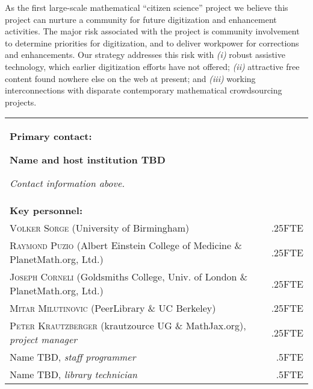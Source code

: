 \documentclass[10pt,letterpaper]{article}
\begin{document}
As the first large-scale mathematical ``citizen science'' project we
believe this project can nurture a community for future digitization
and enhancement activities.  The major risk associated with the
project is community involvement to determine priorities for
digitization, and to deliver workpower for corrections and
enhancements.  Our strategy addresses this risk with \emph{(i)} robust
assistive technology, which earlier digitization efforts have not
offered; \emph{(ii)} attractive free content found nowhere else on the
web at present; and \emph{(iii)} working interconnections with
disparate contemporary mathematical crowdsourcing projects.


\bigskip

\begin{tabular}{p{}r}
\textbf{Primary contact:} \par
\bf{Name and host institution TBD}
\par \emph{Contact information above.} &  \\[1cm]
\textbf{Key personnel:} &\\
\textsc{Volker Sorge} (University of Birmingham) &.25FTE \\
\textsc{Raymond Puzio} (Albert Einstein College of Medicine \& PlanetMath.org, 
Ltd.) & .25FTE \\
\textsc{Joseph Corneli} (Goldsmiths College, Univ. of London \& PlanetMath.org, 
Ltd.) &.25FTE \\
\textsc{Mitar Milutinovic} (PeerLibrary \& UC Berkeley)  &.25FTE \\
\textsc{Peter Krautzberger} (krautzource UG \& MathJax.org), \emph{project 
manager}&.25FTE\\
Name TBD, \emph{staff programmer}   &.5FTE \\
Name TBD, \emph{library technician}  &.5FTE \\
\end{tabular}
\end{document}
